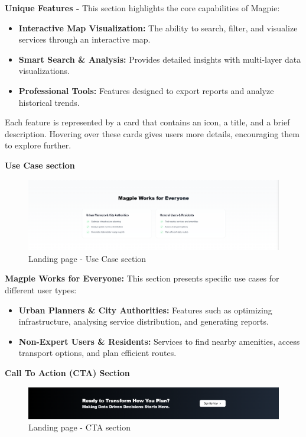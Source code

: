 \textbf{Unique Features {-} } This section highlights the core capabilities of
Magpie:

\begin{itemize}
    \item{} \textbf{Interactive Map Visualization:} The ability to search,
    filter, and visualize services through an interactive map.
    \item{} \textbf{Smart Search \& Analysis:} Provides detailed insights with
    multi{-}layer data visualizations.
    \item{} \textbf{Professional Tools:} Features designed to export reports and
    analyze historical trends.
\end{itemize}

Each feature is represented by a card that contains an icon, a title, and a
brief description. Hovering over these cards gives users more details,
encouraging them to explore further.


\textbf{Use Case section}

\begin{figure}[htbp]
    \centering{}
    \includegraphics[width=1\textwidth]{images/site/landing/landing_4_usecases.png}
    \caption{Landing page {-} Use Case section}
\end{figure}

\textbf{Magpie Works for Everyone:} This section presents specific use cases for
different user types:
\begin{itemize}
    \item{}  \textbf{Urban Planners \& City Authorities:} Features such as
    optimizing infrastructure, analysing service distribution, and generating
    reports.
    \item{} \textbf{Non-Expert Users \& Residents:} Services to find nearby
    amenities, access transport options, and plan efficient routes.
\end{itemize}

\newpage{}

\textbf{Call To Action (CTA) Section}

\begin{figure}[htbp]
    \centering{}
    \includegraphics[width=1\textwidth]{images/site/landing/landing_5_cta.png}
    \caption{Landing page {-} CTA section}
\end{figure}

